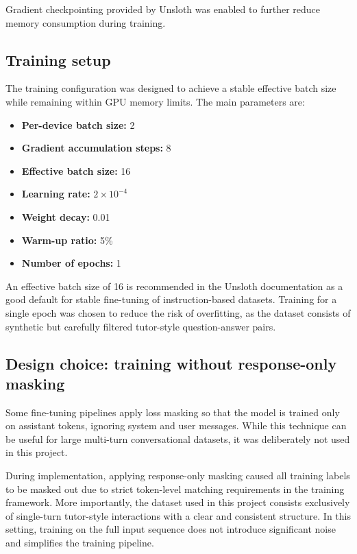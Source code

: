 Gradient checkpointing provided by Unsloth was enabled to further reduce memory consumption during training.

\subsection{Training setup}

The training configuration was designed to achieve a stable effective batch size while remaining within GPU memory limits. The main parameters are:

\begin{itemize}
    \item \textbf{Per-device batch size:} 2
    \item \textbf{Gradient accumulation steps:} 8
    \item \textbf{Effective batch size:} 16
    \item \textbf{Learning rate:} $2 \times 10^{-4}$
    \item \textbf{Weight decay:} 0.01
    \item \textbf{Warm-up ratio:} 5\%
    \item \textbf{Number of epochs:} 1
\end{itemize}

An effective batch size of 16 is recommended in the Unsloth documentation as a good default for stable fine-tuning of instruction-based datasets. Training for a single epoch was chosen to reduce the risk of overfitting, as the dataset consists of synthetic but carefully filtered tutor-style question-answer pairs.

\subsection{Design choice: training without response-only masking}

Some fine-tuning pipelines apply loss masking so that the model is trained only on assistant tokens, ignoring system and user messages. While this technique can be useful for large multi-turn conversational datasets, it was deliberately not used in this project.

During implementation, applying response-only masking caused all training labels to be masked out due to strict token-level matching requirements in the training framework. More importantly, the dataset used in this project consists exclusively of single-turn tutor-style interactions with a clear and consistent structure. In this setting, training on the full input sequence does not introduce significant noise and simplifies the training pipeline.

